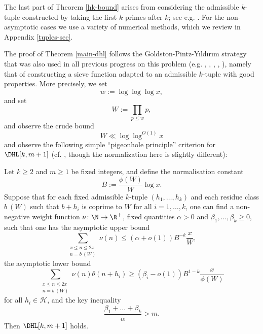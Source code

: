 The last part of Theorem \ref{hk-bound} arises from considering the admissible $k$-tuple constructed by taking the first $k$ primes after $k$; see e.g. \cite[(3.2)]{polymath8a}.  For the non-asymptotic cases we use a variety of numerical methods, which we review in Appendix \ref{tuples-sec}. 

The proof of Theorem \ref{main-dhl} follows the Goldston-Pintz-Y{\i}ld{\i}r{\i}m strategy that was also used in all previous progress on this problem (e.g. \cite{gpy}, \cite{mp}, \cite{zhang}, \cite{polymath8a}, \cite{maynard-new}), namely that of constructing a sieve function adapted to an admissible $k$-tuple with good properties.  More precisely, we set
$$ w := \log \log \log x,$$
and set
$$ W := \prod_{p \leq w} p,$$
and observe the crude bound
\begin{equation}\label{W-bound}
 W \ll \log \log^{O(1)} x
\end{equation}
and observe the following simple ``pigeonhole principle'' criterion for $\DHL[k,m+1]$ (cf. \cite[Lemma 4.1]{polymath8a}, though the normalization here is slightly different):

\begin{lemma}\label{crit} Let $k \geq 2$ and $m \geq 1$ be fixed integers, and define the normalisation constant
\begin{equation}\label{bnorm}
 B := \frac{\phi(W)}{W} \log x.
\end{equation}
Suppose that for each fixed admissible $k$-tuple $(h_1,\dots,h_k)$
  and each residue class $b\ (W)$ such that $b+h_i$ is coprime to $W$ for all $i=1,\dots,k$, one can find a non-negative weight
  function $\nu \colon \N \to \R^+$, fixed quantities $\alpha > 0$ and $\beta_1,\dots,\beta_k \geq
  0$, such that one has the
  asymptotic upper bound
\begin{equation}\label{s1}
 \sum_{\substack{x \leq n \leq 2x\\ n = b\ (W)}} \nu(n) \leq (\alpha+o(1)) B^{-k} \frac{x}{W},
 \end{equation}
the asymptotic lower bound
\begin{equation}\label{s2}
  \sum_{\substack{x \leq n \leq 2x\\ n = b\ (W)}} \nu(n) \theta(n+h_i) \geq (\beta_i-o(1)) B^{1-k} \frac{x}{\phi(W)}
\end{equation}
for all $h_i \in {\mathcal H}$, and the key inequality
\begin{equation}\label{key}
\frac{\beta_1 + \dots + \beta_k}{\alpha} > m.
\end{equation}
Then $\DHL[k,m+1]$ holds.  
\end{lemma}

